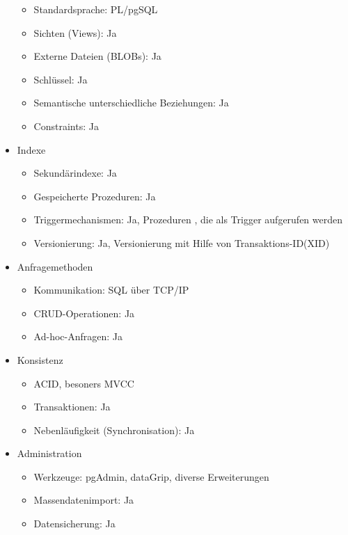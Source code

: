 \begin{itemize}
        \begin{itemize}
            \item Standardsprache: PL/pgSQL %
            \item Sichten (Views): Ja
            \item Externe Dateien (BLOBs): Ja
            \item Schlüssel: Ja
            \item Semantische unterschiedliche Beziehungen: Ja
            \item Constraints: Ja
        \end{itemize}
        \item Indexe
        \begin{itemize}
            \item Sekundärindexe: Ja
            \item Gespeicherte Prozeduren: Ja
            \item Triggermechanismen: Ja, Prozeduren , die als Trigger aufgerufen werden %
            \item Versionierung: Ja, Versionierung mit Hilfe von Transaktions-ID(XID) %
        \end{itemize}
        \item Anfragemethoden
        \begin{itemize}
            \item Kommunikation: \ac{SQL} über \ac{TCP}/\ac{IP}
            \item \ac{CRUD}-Operationen: Ja
            \item Ad-hoc-Anfragen: Ja
        \end{itemize}
        \item Konsistenz
        \begin{itemize}
            \item \ac{ACID}, besoners \ac{MVCC}
            \item Transaktionen: Ja
            \item Nebenläufigkeit (Synchronisation): Ja
        \end{itemize}
        \item Administration
        \begin{itemize}
            \item Werkzeuge: pgAdmin, dataGrip, diverse Erweiterungen
            \item Massendatenimport: Ja
            \item Datensicherung: Ja
        \end{itemize}
    \end{itemize}
